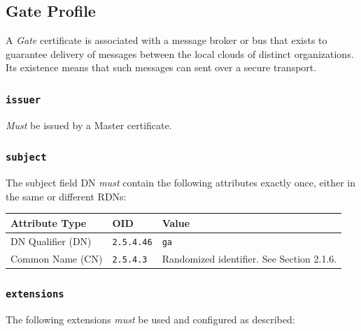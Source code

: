 \newpage
\subsection{Gate Profile}

A \textit{Gate} certificate is associated with a message broker or bus that exists to guarantee delivery of messages between the local clouds of distinct organizations.
Its existence means that such messages can sent over a secure transport.

\subsubsection{\texttt{issuer}}

\textit{Must} be issued by a Master certificate.

\subsubsection{\texttt{subject}}

The subject field DN \textit{must} contain the following attributes exactly once, either in the same or different RDNs:

\vspace*{0.5cm}
\noindent\begin{tabularx}{\textwidth}{| p{4cm} | p{2cm} | X |} \hline
\rowcolor{gray!33} Attribute Type & OID               & Value \\ \hline

DN Qualifier (DN)                 & \texttt{2.5.4.46} & \texttt{ga} \\ \hline
Common Name (CN)                  & \texttt{2.5.4.3}  &  Randomized identifier. See Section 2.1.6. \\ \hline

\end{tabularx}
\vspace*{0.5cm}

\subsubsection{\texttt{extensions}}

The following extensions \textit{must} be used and configured as described:

